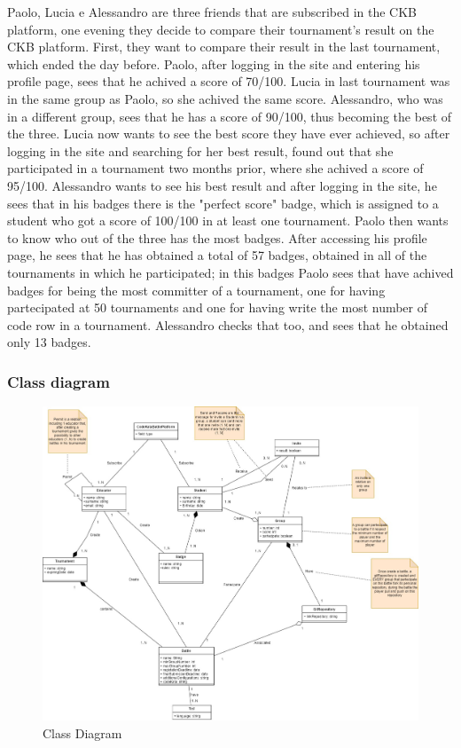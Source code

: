 \documentclass{article}
\newcounter{subsubsubsection}[subsubsection]
\begin{document}
{            
                Paolo, Lucia e Alessandro are three friends that are subscribed in the CKB platform, one evening they decide to compare their tournament's result on the CKB platform. First, they want to compare their result in the last tournament, which ended the day before. 
                Paolo, after logging in the site and entering his profile page, sees that he achived a score of 70/100. Lucia in last tournament was in the same group as Paolo, so she achived the same score. Alessandro, who was in a different group, sees that he has a score of 90/100, thus becoming the best of the three. Lucia now wants to see the best score they have ever achieved, so after logging in the site and searching for her best result, found out that she participated in a tournament two months prior, where she achived a score of 95/100. Alessandro wants to see his best result and after logging in the site, he sees that in his badges there is the "perfect score" badge, which is assigned to a student who got a score of 100/100 in at least one tournament.
                Paolo then wants to know who out of the three has the most badges. After accessing his profile page, he sees that he has obtained a total of 57 badges, obtained in all of the tournaments in which he participated; in this badges Paolo sees that have achived badges for being the most committer of a tournament, one for having partecipated at 50 tournaments and one for having write the most number of code row in a tournament. Alessandro checks that too, and sees that he obtained only 13 badges.
        \subsubsection{Class diagram}
        \begin{figure}[H]
            \centering
            \hspace*{-3cm}\includegraphics[scale=0.4]{images/ClassDiagram/ClassDiagramFinal.jpg}
            \caption{Class Diagram}
            \label{fig:classDiagram}
        \end{figure}
        
}
\end{document}
